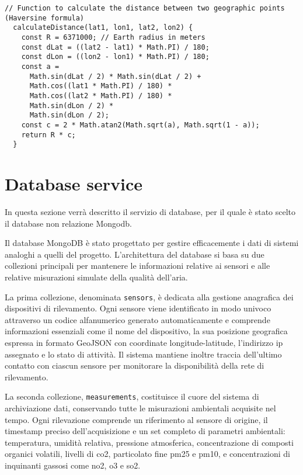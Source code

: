 \begin{lstlisting}[caption={Formual di Haversine in codice Javascript}, label=lst:haversine-formula-code]
  // Function to calculate the distance between two geographic points (Haversine formula)
  calculateDistance(lat1, lon1, lat2, lon2) {
    const R = 6371000; // Earth radius in meters
    const dLat = ((lat2 - lat1) * Math.PI) / 180;
    const dLon = ((lon2 - lon1) * Math.PI) / 180;
    const a =
      Math.sin(dLat / 2) * Math.sin(dLat / 2) +
      Math.cos((lat1 * Math.PI) / 180) *
      Math.cos((lat2 * Math.PI) / 180) *
      Math.sin(dLon / 2) *
      Math.sin(dLon / 2);
    const c = 2 * Math.atan2(Math.sqrt(a), Math.sqrt(1 - a));
    return R * c;
  }
\end{lstlisting}

\section{Database service}

In questa sezione verrà descritto il servizio di database, per il quale è stato scelto il database non relazione
Mongodb.

Il database MongoDB è stato progettato per gestire efficacemente i dati di sistemi analoghi a quelli del progetto.
L'architettura del database si basa su due collezioni principali per mantenere le informazioni relative ai
sensori e alle relative misurazioni simulate della qualità dell'aria.

La prima collezione, denominata \texttt{sensors}, è dedicata alla gestione anagrafica dei dispositivi di rilevamento.
Ogni sensore viene identificato in modo univoco attraverso un codice alfanumerico generato automaticamente e comprende
informazioni essenziali come il nome del dispositivo, la sua posizione geografica espressa in formato GeoJSON
con coordinate longitude-latitude, l'indirizzo \acrshort{ip} assegnato e lo stato di attività.
Il sistema mantiene inoltre traccia dell'ultimo contatto con ciascun sensore per monitorare la disponibilità
della rete di rilevamento.

La seconda collezione, \texttt{measurements}, costituisce il cuore del sistema di archiviazione dati,
conservando tutte le misurazioni ambientali acquisite nel tempo. Ogni rilevazione comprende un riferimento al sensore
di origine, il timestamp preciso dell'acquisizione e un set completo di parametri ambientali: temperatura,
umidità relativa, pressione atmosferica, concentrazione di composti organici volatili, livelli di \acrshort{co2},
particolato fine \acrshort{pm25} e \acrshort{pm10}, e concentrazioni di inquinanti gassosi come \acrshort{no2},
\acrshort{o3} e \acrshort{so2}.

